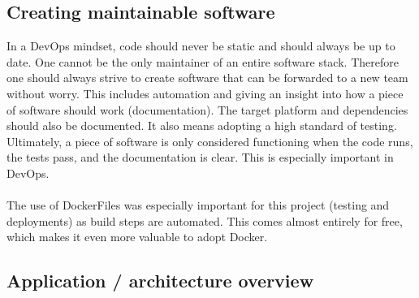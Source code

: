 \documentclass[11pt]{article}
\begin{document}
\subsection{Creating maintainable software}
In a DevOps mindset, code should never be static and should always be up to date. One cannot be the only maintainer of an entire software stack. Therefore one should always strive to create software that can be forwarded to a new team without worry. This includes automation and giving an insight into how a piece of software should work (documentation). The target platform and dependencies should also be documented. It also means adopting a high standard of testing. Ultimately, a piece of software is only considered functioning when the code runs, the tests pass, and the documentation is clear. This is especially important in DevOps.
\\\\
The use of DockerFiles was especially important for this project (testing and deployments) as build steps are automated. This comes almost entirely for free, which makes it even more valuable to adopt Docker. 


\subsection{Application / architecture overview}
\end{document}
